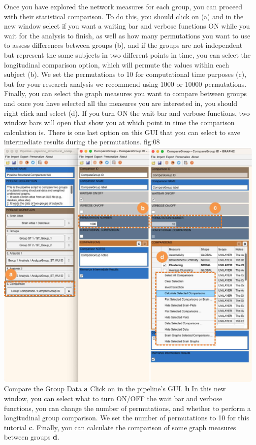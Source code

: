 \documentclass[justified]{tufte-handout}
\begin{document}
Once you have explored the network measures for each group, you can proceed with their statistical comparison. To do this, you should click on  (a) and in the new window select if you want a waiting bar and verbose functions ON while you wait for the analysis to finish, as well as how many permutations you want to use to assess differences between groups ({b}), and if the groups are not independent but represent the same subjects in two different points in time, you can select the longitudinal comparison option, which will permute the values within each subject ({b}). We set the permutations to 10 for computational time purposes ({c}), but for your research analysis we recommend using 1000 or 10000 permutations. Finally, you can select the graph measures you want to compare between groups and once you have selected all the measures you are interested in, you should right click and select  ({d}). If you turn ON the wait bar and verbose functions, two window bars will open that show you at which point in time the comparison calculation is. There is one last option on this GUI that you can select to save intermediate results during the permutations.
	{fig:08}
	{
	\includegraphics{fig08.jpg}
	}
	{Compare the Group Data}
	{
	{\bf a} Click on  in the pipeline's GUI.
	{\bf b} In this new window, you can select what to turn ON/OFF the wait bar and verbose functions, you can change the number of permutations, and whether to perform a longitudinal group comparison. We set the number of permutations to 10 for this tutorial {\bf c}. Finally, you can calculate the comparison of some graph measures between groups {\bf d}.
	}
 
\end{document}
